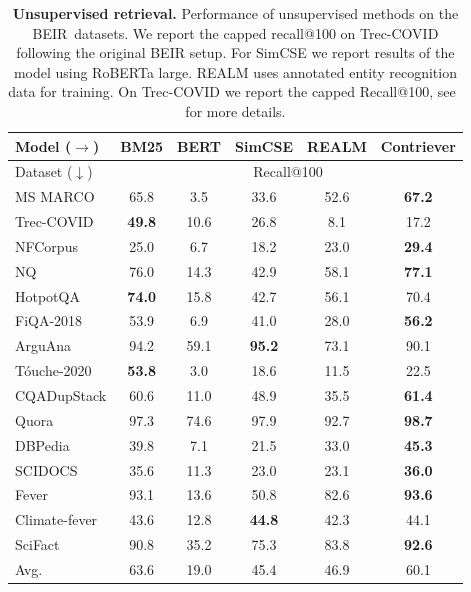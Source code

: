 \documentclass[10pt]{article} %
\def \ours          {Contriever}
\newcommand{\beir}{BEIR}
\begin{document}



\begin{table}[t!]
    \caption{
    \textbf{Unsupervised retrieval.}
    Performance of unsupervised methods on the \beir~datasets.
    We report the capped recall@100 on Trec-COVID following the original BEIR setup.
    For SimCSE we report results of the model using RoBERTa large.
    REALM uses annotated entity recognition data for training.
    On Trec-COVID we report the capped Recall@100, see~\citet{thakur2021beir} for more details.
    }
    \label{tab:unsupervised}
    \centering
    \small
    \begin{tabular}{@{}l  c  c  c c  >{\columncolor{bluegrey}}c}
        \toprule
        Model ($\rightarrow$) & BM25 & BERT & SimCSE & REALM & \ours \\
        \midrule
        Dataset ($\downarrow$) & \multicolumn{5}{c}{Recall@100}\\ 
\midrule
  MS MARCO       & 65.8 & 3.5 & 33.6 & 52.6 & \bf 67.2 \\
  Trec-COVID    & \bf 49.8 & 10.6 & 26.8 & 8.1 & 17.2 \\
  NFCorpus      & 25.0 & 6.7 & 18.2 & 23.0 & \bf 29.4 \\
  NQ            & 76.0 & 14.3 & 42.9 & 58.1 & \bf 77.1 \\
  HotpotQA      & \bf 74.0 & 15.8 & 42.7 & 56.1 & 70.4 \\
  FiQA-2018     & 53.9 & 6.9 & 41.0 & 28.0 & \bf 56.2 \\
  ArguAna       & 94.2 & 59.1 & \bf 95.2 & 73.1 & 90.1 \\
  T\'ouche-2020 & \bf 53.8 & 3.0 & 18.6 & 11.5 & 22.5 \\
  CQADupStack   & 60.6 & 11.0 & 48.9 & 35.5 & \bf 61.4 \\
  Quora         & 97.3 & 74.6 & 97.9 & 92.7 & \bf 98.7 \\
  DBPedia       & 39.8 & 7.1 & 21.5 & 33.0 & \bf 45.3 \\
  SCIDOCS       & 35.6 & 11.3 & 23.0 & 23.1 & \bf 36.0 \\
  Fever         & 93.1 & 13.6 & 50.8 & 82.6 & \bf 93.6 \\
  Climate-fever & 43.6 & 12.8 & \bf 44.8 & 42.3 & 44.1 \\
  SciFact       & 90.8 & 35.2 & 75.3 & 83.8 & \bf 92.6 \\
  \midrule
  Avg. & 63.6 & 19.0 & 45.4 & 46.9 & 60.1 \\

\end{tabular}
\end{table}
\end{document}
